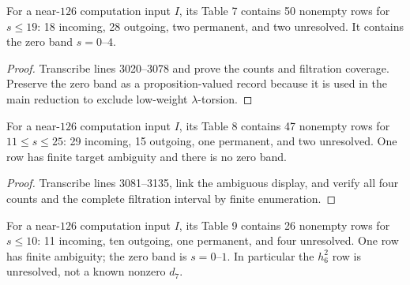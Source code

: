 \begin{proposition}
  \label{data:table-s125-low}
  \notready
  For a near-$126$ computation input $I$, its Table 7 contains 50 nonempty rows
  for $s\le19$: 18 incoming, 28 outgoing, two permanent, and two unresolved.
  It contains the zero band $s=0$--$4$.
\end{proposition}

\begin{proof}
  Transcribe lines 3020--3078 and prove the counts and filtration coverage.
  Preserve the zero band as a proposition-valued record because it is used in
  the main reduction to exclude low-weight $\lambda$-torsion.
\end{proof}

\begin{proposition}
  \label{data:table-s126-high}
  \notready
  For a near-$126$ computation input $I$, its Table 8 contains 47 nonempty rows
  for $11\le s\le25$: 29 incoming, 15 outgoing, one permanent, and two
  unresolved.  One row has finite target ambiguity and there is no zero band.
\end{proposition}

\begin{proof}
  Transcribe lines 3081--3135, link the ambiguous display, and verify all four
  counts and the complete filtration interval by finite enumeration.
\end{proof}

\begin{proposition}
  \label{data:table-s126-low}
  \notready
  For a near-$126$ computation input $I$, its Table 9 contains 26 nonempty rows
  for $s\le10$: 11 incoming, ten outgoing, one permanent, and four unresolved.
  One row has finite ambiguity; the zero band is $s=0$--$1$.  In particular the
  $h_6^2$ row is unresolved, not a known nonzero $d_7$.
\end{proposition}

